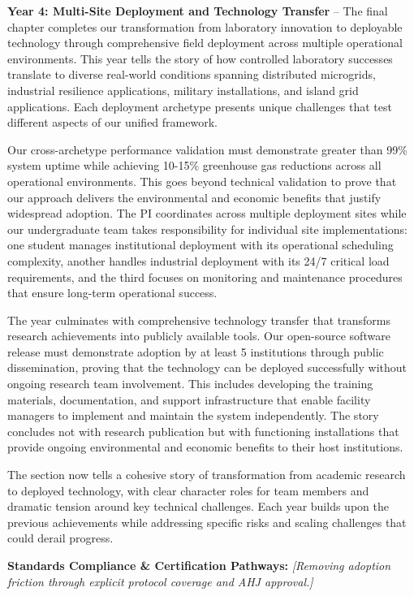 \documentclass[12pt]{article}
\begin{document}
\textbf{Year 4: Multi-Site Deployment and Technology Transfer} – The final chapter completes our transformation from laboratory innovation to deployable technology through comprehensive field deployment across multiple operational environments. This year tells the story of how controlled laboratory successes translate to diverse real-world conditions spanning distributed microgrids, industrial resilience applications, military installations, and island grid applications. Each deployment archetype presents unique challenges that test different aspects of our unified framework.

Our cross-archetype performance validation must demonstrate greater than 99\% system uptime while achieving 10-15\% greenhouse gas reductions across all operational environments. This goes beyond technical validation to prove that our approach delivers the environmental and economic benefits that justify widespread adoption. The PI coordinates across multiple deployment sites while our undergraduate team takes responsibility for individual site implementations: one student manages institutional deployment with its operational scheduling complexity, another handles industrial deployment with its 24/7 critical load requirements, and the third focuses on monitoring and maintenance procedures that ensure long-term operational success.

The year culminates with comprehensive technology transfer that transforms research achievements into publicly available tools. Our open-source software release must demonstrate adoption by at least 5 institutions through public dissemination, proving that the technology can be deployed successfully without ongoing research team involvement. This includes developing the training materials, documentation, and support infrastructure that enable facility managers to implement and maintain the system independently. The story concludes not with research publication but with functioning installations that provide ongoing environmental and economic benefits to their host institutions.

The section now tells a cohesive story of transformation from academic research to deployed technology, with clear character roles for team members and dramatic tension around key technical challenges. Each year builds upon the previous achievements while addressing specific risks and scaling challenges that could derail progress.

\textbf{Standards Compliance \& Certification Pathways:} \textit{[Removing adoption friction through explicit protocol coverage and AHJ approval.]} 
\end{document}
